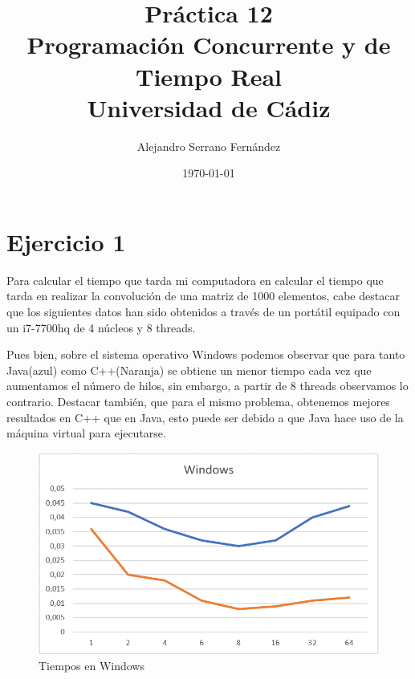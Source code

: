 \documentclass{article}
\title{Práctica 12 \\ Programación Concurrente y de Tiempo Real \\Universidad de Cádiz} %
\author{Alejandro Serrano Fernández} %
\date{\today} %
\begin{document}
\maketitle %



\section{Ejercicio 1}
Para calcular el tiempo que tarda mi computadora en calcular el tiempo que tarda en realizar la convolución de una matriz de 1000 elementos, cabe destacar que los siguientes datos han sido obtenidos a través de un portátil equipado con un i7-7700hq de 4 núcleos y 8 threads. 

\hfill\break
Pues bien, sobre el sistema operativo Windows podemos observar que para tanto Java(azul) como C++(Naranja) se obtiene un menor tiempo cada vez que aumentamos el número de hilos, sin embargo, a partir de 8 threads observamos lo contrario. Destacar también, que para el mismo problema, obtenemos mejores resultados en C++ que en Java, esto puede ser debido a que Java hace uso de la máquina virtual para ejecutarse.


\begin{figure}[h]
\centering
\includegraphics[scale=0.5]{windows.png}
\caption{Tiempos en Windows}
\end{figure}
\end{document}
